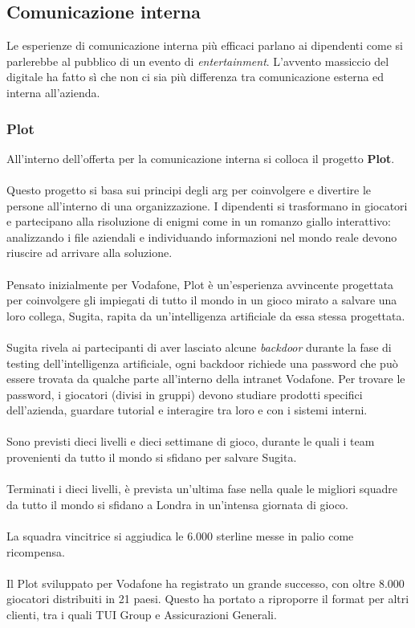 \subsection{Comunicazione interna}
Le esperienze di comunicazione interna più efficaci parlano ai dipendenti come si parlerebbe al pubblico di un evento di \textit{entertainment}. 
L’avvento massiccio del digitale ha fatto sì che non ci sia più differenza tra comunicazione esterna ed interna all’azienda.

\subsubsection{Plot}
All'interno dell'offerta per la comunicazione interna si colloca il progetto \textbf{Plot}.
\\ \\
Questo progetto si basa sui principi degli \gls{arg}\glsfirstoccur{} per coinvolgere e divertire le persone all'interno di una organizzazione. I dipendenti si trasformano in giocatori e partecipano alla risoluzione di enigmi come in un romanzo giallo interattivo: analizzando i file aziendali e individuando informazioni nel mondo reale devono riuscire ad arrivare alla soluzione.
\\ \\
Pensato inizialmente per Vodafone, Plot è un'esperienza avvincente progettata per coinvolgere gli impiegati di tutto il mondo in un gioco mirato a salvare una loro collega, Sugita, rapita da un'intelligenza artificiale da essa stessa progettata.
\\ \\
Sugita rivela ai partecipanti di aver lasciato alcune \textit{backdoor} durante la fase di testing dell'intelligenza artificiale, ogni backdoor richiede una password che può essere trovata da qualche parte all'interno della intranet Vodafone. 
Per trovare le password, i giocatori (divisi in gruppi) devono studiare prodotti specifici dell'azienda, guardare tutorial e interagire tra loro e con i sistemi interni.
\\ \\
Sono previsti dieci livelli e dieci settimane di gioco, durante le quali i team provenienti da tutto il mondo si sfidano per salvare Sugita.
\\ \\
Terminati i dieci livelli, è prevista un'ultima fase nella quale le migliori squadre da tutto il mondo si sfidano a Londra in un'intensa giornata di gioco.
\\ \\
La squadra vincitrice si aggiudica le 6.000 sterline messe in palio come ricompensa.
\\ \\
Il Plot sviluppato per Vodafone ha registrato un grande successo, con oltre 8.000 giocatori distribuiti in 21 paesi. Questo ha portato a riproporre il format per altri clienti, tra i quali TUI Group e Assicurazioni Generali. 

